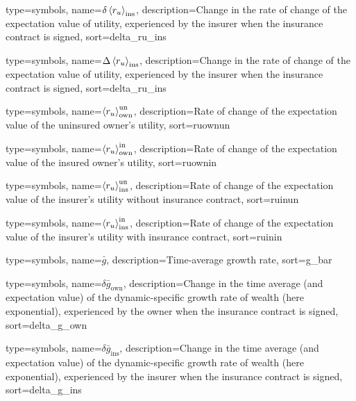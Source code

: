 {
 type={symbols}, 
 name={\ensuremath{\delta \ave{r_u}_{\text{ins}}}},
 description={Change in the rate of change of the expectation value of utility, experienced by the insurer when the insurance contract is signed},
 sort=delta_ru_ins
}

{
 type={symbols}, 
 name={\ensuremath{\Delta \ave{r_u}_{\text{ins}}}},
 description={Change in the rate of change of the expectation value of utility, experienced by the insurer when the insurance contract is signed},
 sort=delta_ru_ins
}

{
  type={symbols}, 
  name={\ensuremath{\ave{r_u}_{\text{own}}^{\text{un}}}},
  description={Rate of change of the expectation value of the uninsured owner's utility},
  sort=ruownun
}

{
  type={symbols}, 
  name={\ensuremath{\ave{r_u}_{\text{own}}^{\text{in}}}},
  description={Rate of change of the expectation value of the insured owner's utility},
  sort=ruownin
}


{
  type={symbols}, 
  name={\ensuremath{\ave{r_u}_{\text{ins}}^{\text{un}}}},
  description={Rate of change of the expectation value of the insurer's utility without insurance contract},
  sort=ruinun
}

{
  type={symbols}, 
  name={\ensuremath{\ave{r_u}_{\text{ins}}^{\text{in}}}},
  description={Rate of change of the expectation value of the insurer's utility with insurance contract},
  sort=ruinin
}



{
  type={symbols}, 
  name={\ensuremath{\bar{g}}},
  description={Time-average growth rate},
  sort=g_bar
}


{
 type={symbols}, 
 name={\ensuremath{\delta \bar{g}_{\text{own}}}},
 description={Change in the time average (and expectation value) of the dynamic-specific growth rate of wealth (here exponential), experienced by the owner when the insurance contract is signed},
 sort=delta_g_own
}

{
 type={symbols}, 
 name={\ensuremath{\delta \bar{g}_{\text{ins}}}},
 description={Change in the time average (and expectation value) of the dynamic-specific growth rate of wealth (here exponential), experienced by the insurer when the insurance contract is signed},
 sort=delta_g_ins
}

